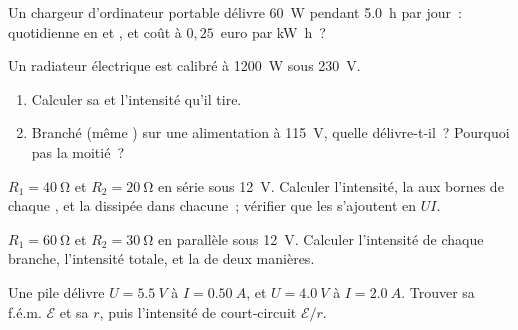 \begin{exercise}[$\star$]\label{exo:g11:circuits-and-power:5}
Un chargeur d'ordinateur portable délivre \qty{60}{W} pendant
\qty{5.0}{h} par jour~:  quotidienne en
 et
, et coût à $0{,}25$~euro par
\unit{kW.h}~?
\end{exercise}

\begin{exercise}[$\star\star$]\label{exo:g11:circuits-and-power:6}
Un radiateur électrique est calibré à \qty{1200}{W} sous \qty{230}{V}.
\begin{enumerate}
  \item Calculer sa  et l'intensité
        qu'il tire.
  \item Branché (même ) sur une
        alimentation à \qty{115}{V}, quelle
         délivre-t-il~? Pourquoi pas
        la moitié~?
\end{enumerate}
\end{exercise}

\begin{exercise}[$\star\star$]\label{exo:g11:circuits-and-power:7}
$R_1 = \qty{40}{\ohm}$ et $R_2 = \qty{20}{\ohm}$ en série sous
\qty{12}{V}. Calculer l'intensité, la
 aux bornes de chaque , et
la  dissipée dans chacune~; vérifier
que les  s'ajoutent en $UI$.
\end{exercise}

\begin{exercise}[$\star\star$]\label{exo:g11:circuits-and-power:8}
$R_1 = \qty{60}{\ohm}$ et $R_2 = \qty{30}{\ohm}$ en parallèle sous
\qty{12}{V}. Calculer l'intensité de chaque branche, l'intensité
totale, et la  de deux
manières.
\end{exercise}

\begin{exercise}[$\star\star$]\label{exo:g11:circuits-and-power:9}
Une pile délivre $U = \qty{5.5}{V}$ à $I = \qty{0.50}{A}$, et
$U = \qty{4.0}{V}$ à $I = \qty{2.0}{A}$. Trouver sa f.é.m.
$\mathcal{E}$ et sa  $r$, puis
l'intensité de court-circuit $\mathcal{E}/r$.
\end{exercise}

